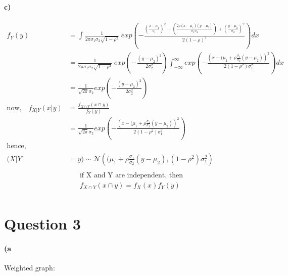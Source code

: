 \documentclass[letterpaper,12pt,titlepage,oneside,final]{book}
\begin{document}
\paragraph{c)}
\begin{align*}
f_Y(y) &=\int\frac{1}{2\pi\sigma_1\sigma_2\sqrt{1-\rho^2}}\;exp\left(-\frac{\left(\frac{x-\mu_1}{\sigma_1}\right)^2 - \left( \frac{2\rho(x-\mu_1)(y-\mu_2)}{\sigma_1\sigma_2} \right) + \left(\frac{y-\mu_2}{\sigma_2}\right)^2}{2(1-\rho)^2}\right)dx\\
&=\frac{1}{2\pi\sigma_1\sigma_2\sqrt{1-\rho^2}}\;exp\left(-\frac{(y-\mu_2)^2}{2\sigma_2^2}\right)\int_{-\infty}^{\infty}exp\left(-\frac{\left(x-(\mu_1 + \rho\frac{\sigma_1}{\sigma_2}(y-\mu_2)\right)^2}{2(1-\rho^2)\sigma_1^2}\right)dx\\
&=\frac{1}{\sqrt{2\pi}\sigma_2}exp\left( -\frac{(y-\mu_2)^2}{2\sigma_2^2} \right)\\
\text{now,}\quad
f_{X|Y}(x|y)&= \frac{f_{X\cap Y}(x\cap y)}{f_Y(y)}\\
&=\frac{1}{\sqrt{2\pi}\sigma_2}exp\left(-\frac{\left(x-(\mu_1 + \rho\frac{\sigma_1}{\sigma_2}(y-\mu_2)\right)^2}{2(1-\rho^2)\sigma_1^2}\right)\\
\text{hence},\\
(X|Y&=y)\sim\mathcal{N}\left((\mu_1 + \rho\frac{\sigma_1}{\sigma_2}(y-\mu_2),(1-\rho^2)\sigma_1^2\right)\\
\end{align*}
\begin{align*}
\text{if X and Y are independent, then}\\
f_{X\cap Y}(x\cap y)=f_X(x)f_Y(y)\\
\end{align*}
\clearpage

\section*{Question 3}

\paragraph{(a}
Weighted graph:
\end{document}
